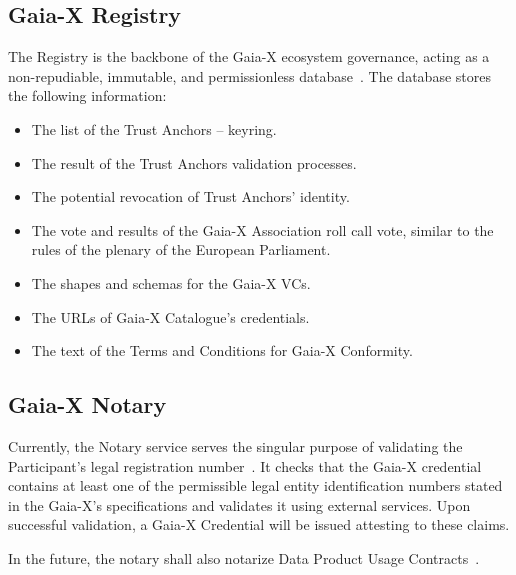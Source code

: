 \subsection{Gaia-X Registry}\label{subsec:gaia-x-registry}

The Registry is the backbone of the Gaia-X ecosystem governance, acting as a non-repudiable, immutable, and permissionless database~\cite{gaiax_trust_framework}.
The database stores the following information:
\begin{itemize}
    \item The list of the Trust Anchors – keyring.
    \item The result of the Trust Anchors validation processes.
    \item The potential revocation of Trust Anchors' identity.
    \item The  vote and results of the Gaia-X Association roll call vote, similar to the rules of the plenary of the European Parliament.
    \item The shapes and schemas for the Gaia-X VCs.
    \item The URLs of Gaia-X Catalogue's credentials.
    \item The text of the Terms and Conditions for Gaia-X Conformity.
\end{itemize}

\subsection{Gaia-X Notary}\label{subsec:gaia-x-notary}

Currently, the Notary service serves the singular purpose of validating the Participant's legal registration number~\cite{gaiax_trust_framework}.
It checks that the Gaia-X credential contains at least one of the permissible legal entity identification numbers stated in the Gaia-X's specifications and validates it using external services.
Upon successful validation, a Gaia-X Credential will be issued attesting to these claims.

In the future, the notary shall also notarize Data Product Usage Contracts~\cite{gaiax_data_exchange_document}.
